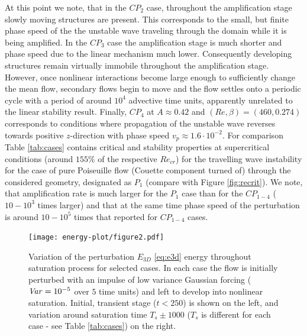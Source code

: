 \documentclass[lineno]{jfm}
\DeclareMathOperator{\Var}{\it Var}
\begin{document}
At this point we note, that in the $CP_2$ case, throughout the amplification stage slowly moving structures are present. This corresponds to the small, but finite phase speed of the the unstable wave traveling through the domain while it is being amplified.
In the $CP_3$ case the amplification stage is much shorter and phase speed due to the linear mechanism much lower.
Consequently developing structures remain virtually immobile throughout the amplification stage.
However, once nonlinear interactions become large enough to sufficiently change the mean flow, secondary flows begin to move and the flow settles onto a periodic cycle with a period of around $10^4$ advective time units, apparently unrelated to the linear stability result.
Finally, $CP_4$ at $A\approx0.42$ and $(Re, \beta)=(460, 0.274)$ corresponds to conditions where propagation of the unstable wave reverses towards positive $z$-direction with phase speed  $v_p\approx1.6\cdot10^{-2}$.
For comparison Table \ref{tab:cases} contains critical and stability properties at supercritical conditions (around $155\%$ of the respective $Re_{cr}$) for the travelling wave instability for the case of pure Poiseuille flow (Couette component turned of) through the considered geometry, designated as $P_1$ (compare with Figure \ref{fig:recrit}).
We note, that amplification rate is much larger for the $P_1$ case than for the $CP_{1-4}$ ($10-10^3$ times larger)
and that
at the same time phase speed of the perturbation is around $10-10^5$ times that reported for $CP_{1-4}$ cases.

\begin{figure}
\centering
	\texttt{[image: energy-plot/figure2.pdf]}
	\caption{Variation of the perturbation $E_{3D}$ \eqref{eq:e3d} energy throughout saturation process for selected cases. In each case the flow is initially perturbed with an impulse of low variance Gaussian forcing (${\Var}=10^{-5}$ over $5$ time units) and left to develop into nonlinear saturation. Initial, transient stage ($t<250$) is shown on the left, and variation around saturation time $T_s\pm1000$ ($T_s$ is different for each case - see Table \ref{tab:cases}) on the right.}
	\label{fig:tstar}
\end{figure}
\end{document}
